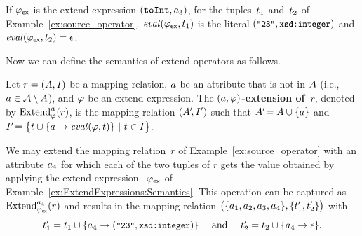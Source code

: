 \begin{example}
	\label{ex:ExtendExpressions:Semantics}
	If $\varphi_\mathsf{ex}$ is the extend expression $(\texttt{toInt}, a_3)$, for the
    tuples~$t_1$ and~$t_2$ of
    Example~\ref{ex:source_operator}, $\mathit{eval}(\varphi_\mathsf{ex},t_1)$ is
    the literal $(\texttt{\small "23"}, \texttt{\small xsd:integer})$ and
    $\mathit{eval}(\varphi_\mathsf{ex},t_2) = \epsilon$.
\end{example}

Now we can define the semantics of extend operators as follows.

\begin{definition}
	\label{def:extend_operator}
	\normalfont
	Let $r = (A, I)$ be a mapping relation,
		$a$ be an attribute that is not in $A$ (i.e., $a \in \mathcal{A} \setminus A$),
	and $\varphi$ be an extend expression.
	The \textbf{$(a, \varphi)$-extension of~$r$},
	denoted by $\text{Extend}_{\varphi}^{a}(r)$,
	is the mapping relation
	$(A'\!,I')$ such that
	$A'\! = A \cup \{ a \}$ and
	$I'\! = \bigl\{t \cup \{a \rightarrow \mathit{eval}(\varphi,t)\} \ | \ t \in I \bigr\}$.
\end{definition}

\begin{example}
	\label{ex:extend_operator}
		We may extend the mapping relation~$r$ of Example~\ref{ex:source_operator}
	with an attribute $a_4$ for which each of the
		two tuples of $r$
	gets the value obtained by applying the extend expression~%
		$\varphi_\mathsf{ex}$
	of Example~\ref{ex:ExtendExpressions:Semantics}. This operation can be captured as $\text{Extend}^{a_4}_{\varphi_\mathsf{ex}}(r)$ and results in the mapping relation $\big(\{ a_1, a_2, a_3, a_4\}, \{t_1',t_2'\}\big)$ with%
%
\vspace{-2mm} %
%
	\begin{equation*}
		t_1' = t_1 \cup \{
        a_4 \rightarrow (\texttt{\small "23"}, \texttt{\small xsd:integer})
		\}
		\quad \text{ and } \quad
		t_2' = t_2 \cup \{
        a_4 \rightarrow \epsilon
		\}
		.
	\end{equation*}
\end{example}


